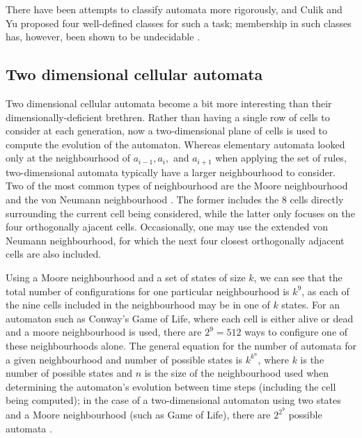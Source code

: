 \documentclass[11pt,a4paper]{article}
\begin{document}
    There have been attempts to classify automata more rigorously, and Culik and
    Yu proposed four well-defined classes for such a task; membership in such
    classes has, however, been shown to be undecidable \cite{CulikYuMembership}.

    \subsection{Two dimensional cellular automata}
    Two dimensional cellular automata become a bit more interesting than their
    dimensionally-deficient brethren. Rather than having a single row of cells
    to consider at each generation, now a two-dimensional plane of cells is used
    to compute the evolution of the automaton. Whereas elementary automata
    looked only at the neighbourhood of $a_{i-1}, a_i,$ and $a_{i+1}$ when
    applying the set of rules, two-dimensional automata typically have a larger
    neighbourhood to consider. Two of the most common types of neighbourhood are
    the Moore neighbourhood and the von Neumann neighbourhood
    \cite{neighbourhoods}. The former includes the 8 cells directly surrounding
    the current cell being considered, while the latter only focuses on the four
    orthogonally ajacent cells. Occasionally, one may use the extended von
    Neumann neighbourhood, for which the next four closest orthogonally adjacent
    cells are also included.

    Using a Moore neighbourhood and a set of states of size $k$, we can see that
    the total number of configurations for one particular neighbourhood is
    $k^9$, as each of the nine cells included in the neighbourhood may be in one
    of $k$ states. For an automaton such as Conway's Game of Life, where each
    cell is either alive or dead and a moore neighbourhood is used, there are
    $2^9=512$ ways to configure one of these neighbourhoods alone. The general
    equation for the number of automata for a given neighbourhood and number of
    possible states is $k^{k^n}$, where $k$ is the number of possible states and
    $n$ is the size of the neighbourhood used when determining the automaton's
    evolution between time steps (including the cell being computed); in the
    case of a two-dimensional automaton using two states and a Moore
    neighbourhood (such as Game of Life), there are $2^{2^9}$ possible automata
    \cite{num_rules}.
\end{document}

